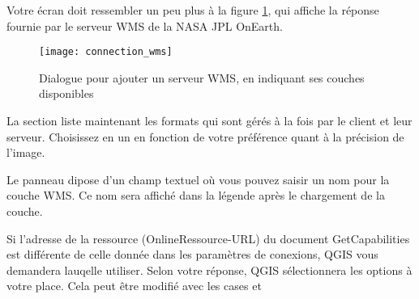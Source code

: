 Votre écran doit ressembler un peu plus à la figure \ref{fig:connection_wms}, qui affiche la réponse fournie par le serveur WMS de la NASA JPL OnEarth.

\begin{figure}[ht]
\centering
\texttt{[image: connection\_wms]}
\caption{Dialogue pour ajouter un serveur WMS, en indiquant ses couches
disponibles \nixcaption}\label{fig:connection_wms}
\end{figure}


La section  liste maintenant les formats qui sont gérés à la fois par le client et leur serveur. Choisissez en un en fonction de votre préférence quant à la précision de l'image.


Le panneau  dipose d'un champ textuel où vous pouvez saisir un nom pour la couche WMS. Ce nom sera affiché dans la légende après le chargement de la couche.


Si l'adresse de la ressource (OnlineRessource-URL) du document GetCapabilities est différente de celle donnée dans les paramètres de conexions, QGIS vous demandera lauqelle utiliser. Selon votre réponse, QGIS sélectionnera les options à votre place. Cela peut être modifié avec les cases  et 

